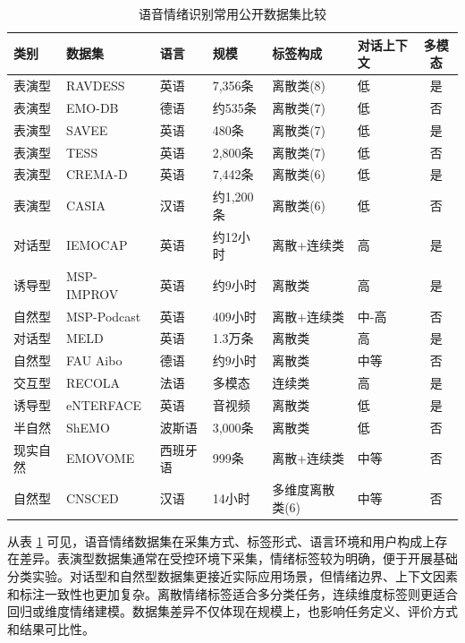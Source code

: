 \begin{table}[!ht]
\scriptsize
\centering
\caption{语音情绪识别常用公开数据集比较} \label{tab:datasets}
\begin{tabularx}{\textwidth}{@{}l >{\raggedright\arraybackslash}p{2.2cm} l l >{\centering\arraybackslash}X >{\centering\arraybackslash}X c@{}}
\toprule
\textbf{类别} & \textbf{数据集} & \textbf{语言} & \textbf{规模} & \textbf{标签构成} & \textbf{对话上下文} & \textbf{多模态} \\ \midrule
表演型 & RAVDESS & 英语 & 7,356条 & 离散类(8) & 低 & 是 \\ \midrule
表演型 & EMO-DB & 德语 & 约535条 & 离散类(7) & 低 & 否 \\ \midrule
表演型 & SAVEE & 英语 & 480条 & 离散类(7) & 低 & 是 \\ \midrule
表演型 & TESS & 英语 & 2,800条 & 离散类(7) & 低 & 否 \\ \midrule
表演型 & CREMA-D & 英语 & 7,442条 & 离散类(6) & 低 & 是 \\ \midrule
表演型 & CASIA & 汉语 & 约1,200条 & 离散类(6) & 低 & 否 \\ \midrule
对话型 & IEMOCAP & 英语 & 约12小时 & 离散+连续类 & 高 & 是 \\ \midrule
诱导型 & MSP-IMPROV & 英语 & 约9小时 & 离散类 & 高 & 是 \\ \midrule
自然型 & MSP-Podcast & 英语 & 409小时 & 离散+连续类 & 中-高 & 否 \\ \midrule
对话型 & MELD & 英语 & 1.3万条 & 离散类 & 高 & 是 \\ \midrule
自然型 & FAU Aibo & 德语 & 约9小时 & 离散类 & 中等 & 否 \\ \midrule
交互型 & RECOLA & 法语 & 多模态 & 连续类 & 高 & 是 \\ \midrule
诱导型 & eNTERFACE & 英语 & 音视频 & 离散类 & 低 & 是 \\ \midrule
半自然 & ShEMO & 波斯语 & 3,000条 & 离散类 & 低 & 否 \\ \midrule
现实自然 & EMOVOME & 西班牙语 & 999条 & 离散+连续类 & 中等 & 否 \\ \midrule
自然型 & CNSCED & 汉语 & 14小时 & 多维度离散类(6) & 中等 & 否 \\ \bottomrule
\end{tabularx}
\end{table}

从表 \ref{tab:datasets} 可见，语音情绪数据集在采集方式、标签形式、语言环境和用户构成上存在差异。表演型数据集通常在受控环境下采集，情绪标签较为明确，便于开展基础分类实验。对话型和自然型数据集更接近实际应用场景，但情绪边界、上下文因素和标注一致性也更加复杂。离散情绪标签适合多分类任务，连续维度标签则更适合回归或维度情绪建模。数据集差异不仅体现在规模上，也影响任务定义、评价方式和结果可比性\cite{ma2023review,pappagari2023music}。

